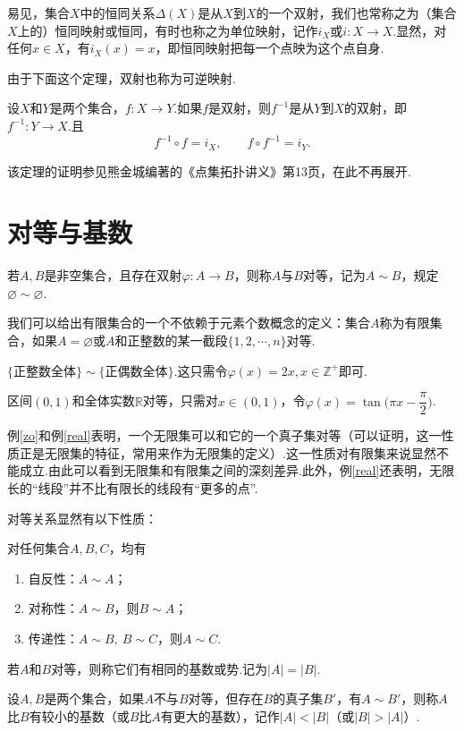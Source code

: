 易见，集合$X$中的恒同关系$\Delta(X)$是从$X$到$X$的一个双射，我们也常称之为（集合$X$上的）{\heiti 恒同映射}或{\heiti 恒同}，有时也称之为{\heiti 单位映射}，记作$i_X$或$i:X\rightarrow X$.显然，对任何$x\in X$，有$i_X(x)=x$，即恒同映射把每一个点映为这个点自身.

由于下面这个定理，双射也称为{\heiti 可逆映射}.
\begin{theorem}
	设$X$和$Y$是两个集合，$f:X\rightarrow Y$.如果$f$是双射，则$f^{-1}$是从$Y$到$X$的双射，即$f^{-1}:Y\rightarrow X$.且
	$$f^{-1}\circ f=i_X,\qquad f\circ f^{-1}=i_Y.$$
\end{theorem}
该定理的证明参见熊金城编著的《点集拓扑讲义》第13页，在此不再展开.
\section{对等与基数}
\begin{definition}[对等]
	若$A,B$是非空集合，且存在双射$\varphi:A\rightarrow B$，则称$A$与$B${\heiti 对等}，记为$A\sim B$，规定$\varnothing\sim \varnothing$.
\end{definition}
\begin{example}
	我们可以给出有限集合的一个不依赖于元素个数概念的定义：集合$A$称为有限集合，如果$A=\varnothing$或$A$和正整数的某一截段$\{1,2,\cdots,n\}$对等.
\end{example}
\begin{example}\label{zo}
	$\{\text{正整数全体}\}\sim \{\text{正偶数全体}\}$.这只需令$\varphi(x)=2x,x\in\mathbb{Z}^+$即可.
\end{example}
\begin{example}\label{real}
	区间$(0,1)$和全体实数$\mathbb{R}$对等，只需对$x\in(0,1)$，令$\varphi(x)=\tan\bigg(\pi x-\dfrac{\pi}{2}\bigg)$.
\end{example}

例\ref{zo}和例\ref{real}表明，一个无限集可以和它的一个真子集对等（可以证明，这一性质正是无限集的特征，常用来作为无限集的定义）.这一性质对有限集来说显然不能成立.由此可以看到无限集和有限集之间的深刻差异.此外，例\ref{real}还表明，无限长的“线段”并不比有限长的线段有“更多的点”.

对等关系显然有以下性质：
\begin{theorem}
	对任何集合$A,B,C$，均有
	\begin{enumerate}
		\item 自反性：$A\sim A$；
		\item 对称性：$A\sim B$，则$B\sim A$；
		\item 传递性：$A\sim B,\ B\sim C$，则$A\sim C$.
	\end{enumerate}
\end{theorem}
\begin{definition}[基数]
	若$A$和$B$对等，则称它们有相同的{\heiti 基数}或{\heiti 势}.记为$|A|=|B|$.
\end{definition}
\begin{definition}
	设$A,B$是两个集合，如果$A$不与$B$对等，但存在$B$的真子集$B'$，有$A\sim B'$，则称$A$比$B$有{\heiti 较小的基数}（或$B$比$A$有{\heiti 更大的基数}），记作$|A|<|B|$（或$|B|>|A|$）.
\end{definition}

